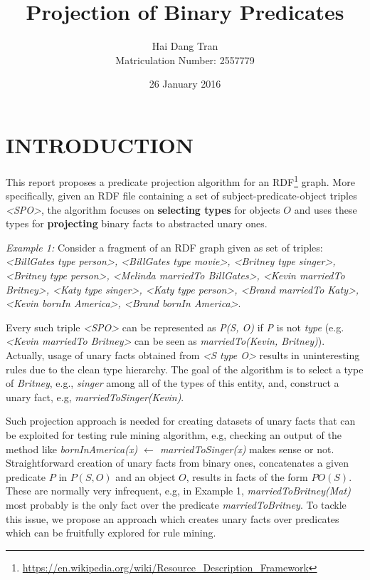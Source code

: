 \documentclass{acm_proc_article-sp}
\begin{document}
\title{Projection of Binary Predicates}
\author{
\alignauthor
Hai Dang Tran\\Matriculation Number: 2557779
}
\date{26 January 2016}

\maketitle

\section{INTRODUCTION}
This report proposes a predicate projection algorithm for an RDF\footnote{\url{https://en.wikipedia.org/wiki/Resource_Description_Framework}} graph. More specifically, given an RDF file containing a set of subject-predicate-object triples \textit{<SPO>}, the algorithm focuses on \textbf{selecting types} for objects $O$ and uses these types for \textbf{projecting} binary facts to abstracted unary ones.

\textit{Example 1:} Consider a fragment of an RDF graph given as set of triples: \textit{<BillGates type person>, <BillGates type movie>, <Britney type singer>, <Britney type person>, <Melinda marriedTo BillGates>, <Kevin marriedTo Britney>, <Katy type singer>, <Katy type person>, <Brand marriedTo Katy>, <Kevin bornIn America>, <Brand bornIn America>}.

Every such triple \textit{<SPO>} can be represented as \textit{P(S, O)} if \textit{P} is not \textit{type} (e.g. \textit{<Kevin marriedTo Britney>} can be seen as \textit{marriedTo(Kevin, Britney)}). Actually, usage of unary facts obtained from \textit{<S type O>} results in uninteresting rules due to the clean type hierarchy. The goal of the algorithm is to select a type of \textit{Britney}, e.g., \textit{singer} among all of the types of this entity, and, construct a unary fact, e.g, \textit{marriedToSinger(Kevin)}.

Such projection approach is needed for creating datasets of unary facts that can be exploited for testing rule mining algorithm, e.g, checking an output of the method like \textit{bornInAmerica(x) $\leftarrow$ marriedToSinger(x)} makes sense or not. Straightforward creation of unary facts from binary ones, concatenates a given predicate $P$ in $P(S, O)$ and an object $O$, results in facts of the form $PO(S)$. These are normally very infrequent, e.g, in Example 1, \textit{marriedToBritney(Mat)} most probably is the only fact over the predicate \textit{marriedToBritney}.  To tackle this issue, we propose an approach which creates unary facts over predicates which can be fruitfully explored for rule mining.
\end{document}
